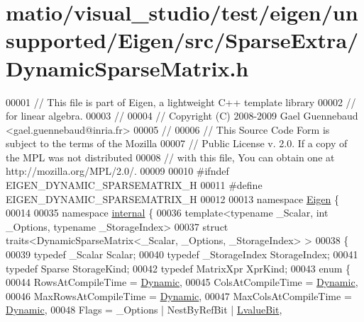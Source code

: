 \hypertarget{matio_2visual__studio_2test_2eigen_2unsupported_2_eigen_2src_2_sparse_extra_2_dynamic_sparse_matrix_8h_source}{}\section{matio/visual\+\_\+studio/test/eigen/unsupported/\+Eigen/src/\+Sparse\+Extra/\+Dynamic\+Sparse\+Matrix.h}
\label{matio_2visual__studio_2test_2eigen_2unsupported_2_eigen_2src_2_sparse_extra_2_dynamic_sparse_matrix_8h_source}

\begin{DoxyCode}
00001 \textcolor{comment}{// This file is part of Eigen, a lightweight C++ template library}
00002 \textcolor{comment}{// for linear algebra.}
00003 \textcolor{comment}{//}
00004 \textcolor{comment}{// Copyright (C) 2008-2009 Gael Guennebaud <gael.guennebaud@inria.fr>}
00005 \textcolor{comment}{//}
00006 \textcolor{comment}{// This Source Code Form is subject to the terms of the Mozilla}
00007 \textcolor{comment}{// Public License v. 2.0. If a copy of the MPL was not distributed}
00008 \textcolor{comment}{// with this file, You can obtain one at http://mozilla.org/MPL/2.0/.}
00009 
00010 \textcolor{preprocessor}{#ifndef EIGEN\_DYNAMIC\_SPARSEMATRIX\_H}
00011 \textcolor{preprocessor}{#define EIGEN\_DYNAMIC\_SPARSEMATRIX\_H}
00012 
00013 \textcolor{keyword}{namespace }\hyperlink{namespace_eigen}{Eigen} \{ 
00014 
00035 \textcolor{keyword}{namespace }\hyperlink{namespaceinternal}{internal} \{
00036 \textcolor{keyword}{template}<\textcolor{keyword}{typename} \_Scalar, \textcolor{keywordtype}{int} \_Options, \textcolor{keyword}{typename} \_StorageIndex>
00037 \textcolor{keyword}{struct }traits<DynamicSparseMatrix<\_Scalar, \_Options, \_StorageIndex> >
00038 \{
00039   \textcolor{keyword}{typedef} \_Scalar Scalar;
00040   \textcolor{keyword}{typedef} \_StorageIndex StorageIndex;
00041   \textcolor{keyword}{typedef} Sparse StorageKind;
00042   \textcolor{keyword}{typedef} MatrixXpr XprKind;
00043   \textcolor{keyword}{enum} \{
00044     RowsAtCompileTime = \hyperlink{namespace_eigen_ad81fa7195215a0ce30017dfac309f0b2}{Dynamic},
00045     ColsAtCompileTime = \hyperlink{namespace_eigen_ad81fa7195215a0ce30017dfac309f0b2}{Dynamic},
00046     MaxRowsAtCompileTime = \hyperlink{namespace_eigen_ad81fa7195215a0ce30017dfac309f0b2}{Dynamic},
00047     MaxColsAtCompileTime = \hyperlink{namespace_eigen_ad81fa7195215a0ce30017dfac309f0b2}{Dynamic},
00048     Flags = \_Options | NestByRefBit | \hyperlink{group__flags_gae2c323957f20dfdc6cb8f44428eaec1a}{LvalueBit},

\end{DoxyCode}
